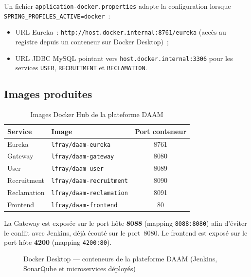 Un fichier \texttt{application-docker.properties} adapte la configuration
lorsque \texttt{SPRING\_PROFILES\_ACTIVE=docker}~:
\begin{itemize}
  \item URL Eureka~: \texttt{http://host.docker.internal:8761/eureka}
        (accès au registre depuis un conteneur sur Docker Desktop)~;
  \item URL JDBC MySQL pointant vers \texttt{host.docker.internal:3306}
        pour les services \texttt{USER}, \texttt{RECRUITMENT} et
        \texttt{RECLAMATION}.
\end{itemize}

\subsection{Images produites}

\begin{table}[htbp]
  \centering
  \small
  \caption{Images Docker Hub de la plateforme DAAM}
  \label{tab:docker-images}
  \begin{tabular}{|l|l|c|}
    \hline
    \textbf{Service} & \textbf{Image} & \textbf{Port conteneur} \\
    \hline
    Eureka & \texttt{lfray/daam-eureka} & 8761 \\
    Gateway & \texttt{lfray/daam-gateway} & 8080 \\
    User & \texttt{lfray/daam-user} & 8089 \\
    Recruitment & \texttt{lfray/daam-recruitment} & 8090 \\
    Reclamation & \texttt{lfray/daam-reclamation} & 8091 \\
    Frontend & \texttt{lfray/daam-frontend} & 80 \\
    \hline
  \end{tabular}
\end{table}

La Gateway est exposée sur le port hôte \textbf{8088} (mapping
\texttt{8088:8080}) afin d'éviter le conflit avec Jenkins, déjà écouté sur
le port~8080. Le frontend est exposé sur le port hôte \textbf{4200}
(mapping \texttt{4200:80}).

\begin{figure}[H]
  \centering
  \caption{Docker Desktop --- conteneurs de la plateforme DAAM
           (Jenkins, SonarQube et microservices déployés)}
  \label{fig:devops-docker-containers}
\end{figure}


